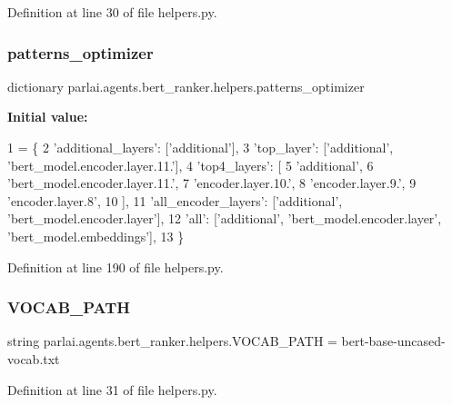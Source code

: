 Definition at line 30 of file helpers.\+py.

\mbox{\label{namespaceparlai_1_1agents_1_1bert__ranker_1_1helpers_aebda7127ff111489042a68edcd62830f}} 
\subsubsection{\texorpdfstring{patterns\+\_\+optimizer}{patterns\_optimizer}}
{\footnotesize\ttfamily dictionary parlai.\+agents.\+bert\+\_\+ranker.\+helpers.\+patterns\+\_\+optimizer}

{\bfseries Initial value\+:}
\begin{DoxyCode}
1 =  \{
2     \textcolor{stringliteral}{'additional\_layers'}: [\textcolor{stringliteral}{'additional'}],
3     \textcolor{stringliteral}{'top\_layer'}: [\textcolor{stringliteral}{'additional'}, \textcolor{stringliteral}{'bert\_model.encoder.layer.11.'}],
4     \textcolor{stringliteral}{'top4\_layers'}: [
5         \textcolor{stringliteral}{'additional'},
6         \textcolor{stringliteral}{'bert\_model.encoder.layer.11.'},
7         \textcolor{stringliteral}{'encoder.layer.10.'},
8         \textcolor{stringliteral}{'encoder.layer.9.'},
9         \textcolor{stringliteral}{'encoder.layer.8'},
10     ],
11     \textcolor{stringliteral}{'all\_encoder\_layers'}: [\textcolor{stringliteral}{'additional'}, \textcolor{stringliteral}{'bert\_model.encoder.layer'}],
12     \textcolor{stringliteral}{'all'}: [\textcolor{stringliteral}{'additional'}, \textcolor{stringliteral}{'bert\_model.encoder.layer'}, \textcolor{stringliteral}{'bert\_model.embeddings'}],
13 \}
\end{DoxyCode}


Definition at line 190 of file helpers.\+py.

\mbox{\label{namespaceparlai_1_1agents_1_1bert__ranker_1_1helpers_a88c47b25646aed4d2d140a159443bb7c}} 
\subsubsection{\texorpdfstring{V\+O\+C\+A\+B\+\_\+\+P\+A\+TH}{VOCAB\_PATH}}
{\footnotesize\ttfamily string parlai.\+agents.\+bert\+\_\+ranker.\+helpers.\+V\+O\+C\+A\+B\+\_\+\+P\+A\+TH = \textquotesingle{}bert-\/base-\/uncased-\/vocab.\+txt\textquotesingle{}}



Definition at line 31 of file helpers.\+py.

